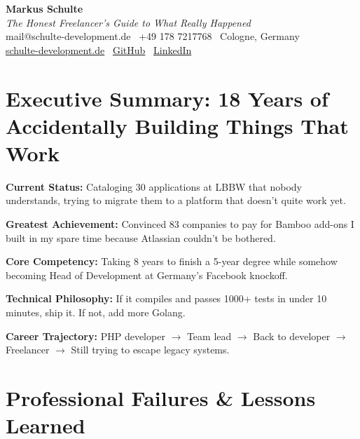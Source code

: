 \documentclass[11pt,a4paper]{article}
\begin{document}
\begin{center}
{\Huge\bfseries Markus Schulte}\\[0.5em]
{\Large\textit{The Honest Freelancer's Guide to What Really Happened}}\\[0.5em]
{\color{lightgray}mail@schulte-development.de \textbullet\ +49 178 7217768 \textbullet\ Cologne, Germany}\\
{\color{lightgray}\href{https://schulte-development.de}{schulte-development.de} \textbullet\ \href{https://github.com/SchulteMarkus}{GitHub} \textbullet\ \href{https://www.linkedin.com/in/markus-schulte/}{LinkedIn}}
\end{center}

\vspace{1em}

\section*{Executive Summary: 18 Years of Accidentally Building Things That Work}

\textbf{Current Status:} Cataloging 30 applications at LBBW that nobody understands, trying to migrate them to a platform that doesn't quite work yet.

\textbf{Greatest Achievement:} Convinced 83 companies to pay for Bamboo add-ons I built in my spare time because Atlassian couldn't be bothered.

\textbf{Core Competency:} Taking 8 years to finish a 5-year degree while somehow becoming Head of Development at Germany's Facebook knockoff.

\textbf{Technical Philosophy:} If it compiles and passes 1000+ tests in under 10 minutes, ship it. If not, add more Golang.

\textbf{Career Trajectory:} PHP developer $\rightarrow$ Team lead $\rightarrow$ Back to developer $\rightarrow$ Freelancer $\rightarrow$ Still trying to escape legacy systems.

\vspace{1em}

\section*{Professional Failures \& Lessons Learned}
\end{document}
